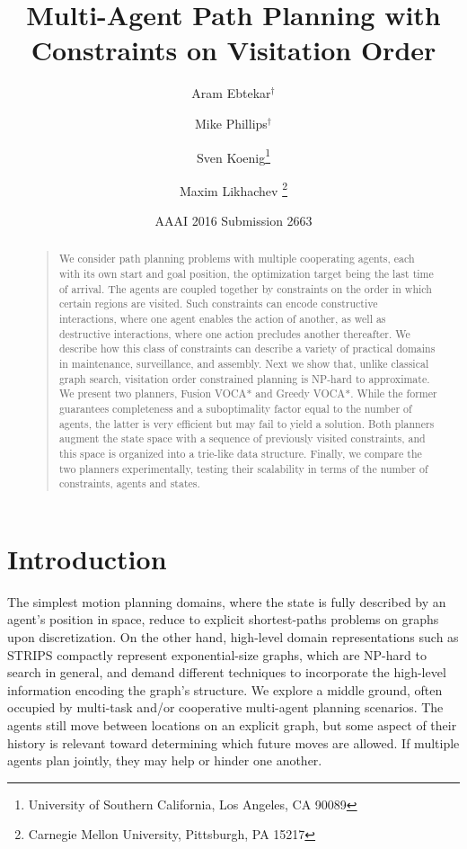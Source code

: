 \documentclass[letterpaper]{article}
\begin{document}
%
\title{Multi-Agent Path Planning with Constraints on Visitation Order}
\author{Aram Ebtekar$^\dagger$ \and Mike Phillips$^\dagger$ \and Sven Koenig\thanks{University of Southern California, Los Angeles, CA 90089} \and Maxim Likhachev%
\thanks{Carnegie Mellon University, Pittsburgh, PA 15217}%
%
}
\author{AAAI 2016 Submission 2663}%
\maketitle
\begin{abstract}
\begin{quote}
We consider path planning problems with multiple cooperating agents, each with its own start and goal position, the optimization target being the last time of arrival. The agents are coupled together by constraints on the order in which certain regions are visited. Such constraints can encode constructive interactions, where one agent enables the action of another, as well as destructive interactions, where one action precludes another thereafter. We describe how this class of constraints can describe a variety of practical domains in maintenance, surveillance, and assembly. Next we show that, unlike classical graph search, visitation order constrained planning is NP-hard to approximate. We present two planners, Fusion VOCA* and Greedy VOCA*. While the former guarantees completeness and a suboptimality factor equal to the number of agents, the latter is very efficient but may fail to yield a solution. Both planners augment the state space with a sequence of previously visited constraints, and this space is organized into a trie-like data structure. Finally, we compare the two planners experimentally, testing their scalability in terms of the number of constraints, agents and states.
\end{quote}
\end{abstract}

\section{Introduction}

The simplest motion planning domains, where the state is fully described by an agent's position in space, reduce to explicit shortest-paths problems on graphs upon discretization. On the other hand, high-level domain representations such as STRIPS compactly represent exponential-size graphs, which are NP-hard to search in general, and demand different techniques to incorporate the high-level information encoding the graph's structure. We explore a middle ground, often occupied by multi-task and/or cooperative multi-agent planning scenarios. The agents still move between locations on an explicit graph, but some aspect of their history is relevant toward determining which future moves are allowed. If multiple agents plan jointly, they may help or hinder one another.
\end{document}
